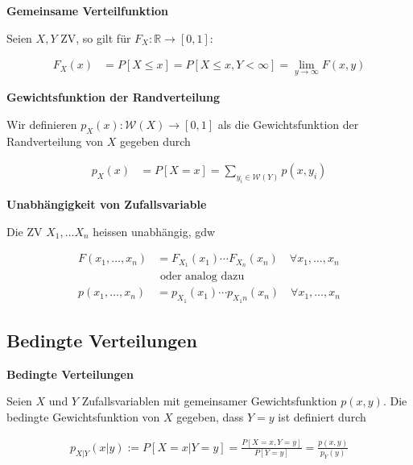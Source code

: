 \documentclass[25pt]{sciposter}
\newcommand{\R}{\mathbb{R}}
\newcommand{\W}{\mathcal{W}}
\newenvironment{method}[1]{\begin{mdframed}[backgroundcolor=blue!10,innertopmargin=15pt, innerbottommargin=15pt,nobreak=true]
		\textbf{#1 }
	}
	{ 
	\end{mdframed}
}
\begin{document}
\begin{multicols}{3}
\begin{method}{Gemeinsame Verteilfunktion}
	Seien $X,Y$ ZV, so gilt für $F_X : \R \to [0,1]$:
	
	\begin{align*}
		F_X(x) &= P[X \leq x] = P[X \leq x , Y < \infty] = \lim\limits_{y\to\infty} F(x,y)
	\end{align*}
\end{method}

\begin{method}{Gewichtsfunktion der Randverteilung}
	Wir definieren $p_X(x) : \W(X) \to [0,1]$ als die Gewichtsfunktion der Randverteilung von $X$ gegeben durch 

	\begin{align*}
p_X(x) &= P[X=x] = \sum_{y_i\in \W(Y)} p(x,y_i)
	\end{align*}

\end{method}


\begin{method}{Unabhängigkeit von Zufallsvariable}
	Die ZV $X_1, \ldots X_n$ heissen unabhängig, gdw 
	
	\begin{align*}
		F(x_1, \ldots, x_n) &= F_{X_1}(x_1) \cdots F_{X_n}(x_n) \quad \forall x_1,\ldots,x_n\\
		&\text{ oder analog dazu}\\
		p(x_1,\ldots, x_n) &= p_{X_1}(x_1)\cdots p_{X_1n}(x_n) \quad \forall x_1,\ldots,x_n
	\end{align*}

	
	
	
\end{method}



\subsection*{Bedingte Verteilungen}

\begin{method}{Bedingte Verteilungen}
	Seien $X$ und $Y$ Zufallsvariablen mit gemeinsamer Gewichtsfunktion $p(x,y)$. Die bedingte Gewichtsfunktion von $X$ gegeben, dass $Y = y$ ist definiert durch
	
	\begin{align*}
		p_{X|Y} (x|y) := P[X=x | Y=y] = \frac{P[X=x, Y=y]}{P[Y=y]} = \frac{p(x,y)}{p_Y(y)}
	\end{align*}
\end{method}


\end{multicols}
\end{document}
